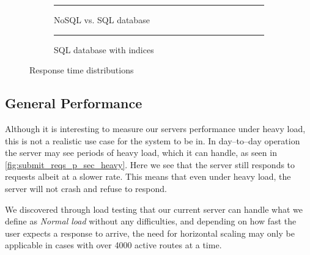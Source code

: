 \begin{figure}[!htb]
    \centering
    \begin{subfigure}[b]{0.5\textwidth}
        \centering
        \rule{5cm}{5cm}
        \caption{NoSQL vs. SQL database}\label{fig:same_response_sql}
    \end{subfigure}\hfill%
    \begin{subfigure}[b]{0.5\textwidth}
        \centering
        \rule{5cm}{5cm}
        \caption{SQL database with indices}\label{fig:fast_response_indices}
    \end{subfigure}
    \caption{Response time distributions}\label{fig:nosql_vs_sql}
\end{figure}

\subsection{General Performance}
Although it is interesting to measure our servers performance under heavy load, this is not a realistic use case for the system to be in.
In day--to--day operation the server may see periods of heavy load, which it can handle, as seen in \cref{fig:submit_reqs_p_sec_heavy}. %
Here we see that the server still responds to requests albeit at a slower rate.
This means that even under heavy load, the server will not crash and refuse to respond.

We discovered through load testing that our current server can handle what we define as \textit{Normal load} without any difficulties, and depending on how fast the user expects a response to arrive, the need for horizontal scaling may only be applicable in cases with over 4000 active routes at a time.
